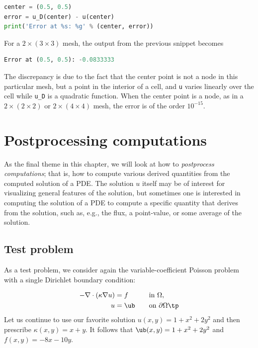 \documentclass[graybox,envcountchap,sectrefs,final]{svmonodo}
\begin{document}
\begin{lstlisting}[language=Python,style=graycolor]
center = (0.5, 0.5)
error = u_D(center) - u(center)
print('Error at %s: %g' % (center, error))
\end{lstlisting}
For a $2\times(3\times 3)$ mesh, the output from the
previous snippet becomes

\begin{lstlisting}[language=Python,style=graycolor]
Error at (0.5, 0.5): -0.0833333
\end{lstlisting}
The discrepancy is due to the fact that the center point is not a node
in this particular mesh, but a point in the interior of a cell, and
\texttt{u} varies linearly over the cell while \Verb!u_D! is a quadratic
function. When the center point is a node, as in a $2\times(2\times
2)$ or $2\times(4\times 4)$ mesh, the error is of the order
$10^{-15}$.

\section{Postprocessing computations}
\label{ftut:possion:2D:varcoeff}


As the final theme in this chapter, we will look at how to
\emph{postprocess computations}; that is, how to compute various derived
quantities from the computed solution of a PDE. The solution $u$
itself may be of interest for visualizing general features of the
solution, but sometimes one is interested in computing the solution of
a PDE to compute a specific quantity that derives from the solution,
such as, e.g., the flux, a point-value, or some average of the
solution.

\subsection{Test problem}

As a test problem, we consider again the variable-coefficient Poisson
problem with a single Dirichlet boundary condition:

\begin{alignat}{2}
    - \nabla\cdot(\kappa\nabla u) &= f \quad &&\mbox{in } \Omega,
\label{ch:poisson0:2D:varcoeff} \\
    u &= \ub \quad &&\mbox{on}\  \partial\Omega\tp
\end{alignat}
Let us continue to use our favorite solution $u(x,y)=1+x^2+2y^2$ and
then prescribe $\kappa(x,y)=x+y$. It follows that
$\ub(x,y) = 1 + x^2 + 2y^2$ and $f(x,y)=-8x-10y$.
\end{document}

